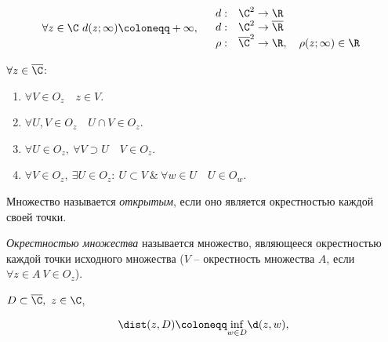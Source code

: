 

\[
  \forall z \in \C \ d(z ; \infty )\coloneqq +\infty, \quad \begin{array}{ll}
    d: & \C^2 \rightarrow \R \\
    d: & \C^2 \rightarrow \overline{\R} \\
    \rho: & \overline{\C}^2 \rightarrow \R, \quad \rho(z ; \infty ) \in \R
  \end{array}
\]

\begin{property}
  $\forall z \in \overline{\C}$:
  \begin{enumerate}
    \item $\forall V \in O_z \quad z \in V$.
    \item $\forall U,V \in O_z \quad U \cap V \in O_z$.
    \item $\forall U \in O_z, \ \forall V \supset U \quad V \in O_z$.
    \item $\forall V \in O_z, \ \exists U \in O_z : \ U \subset V \ \& \ \forall w \in U \quad U \in O_w$.
  \end{enumerate}
\end{property}

\begin{definition}
  Множество называется \emph{открытым}, если оно является окрестностью каждой своей точки.
\end{definition}

\begin{definition}
  \emph{Окрестностью множества} называется множество, являющееся окрестностью каждой точки исходного множества ($V$ -- окрестность множества $A$, если $\forall z \in A \ V \in O_z$).
\end{definition}

\begin{definition}
  $D \subset \overline{\C}, \ z \in \C$,
  \begin{multicols}{2}
    \[
      \dist(z,D)\coloneqq \underset{w \in D}{\inf}\d(z,w),
    \]

    \columnbreak

    \begin{figure}[H]
      \centering
      \label{fig:fig-4}
    \end{figure}
  \end{multicols}
\end{definition}

